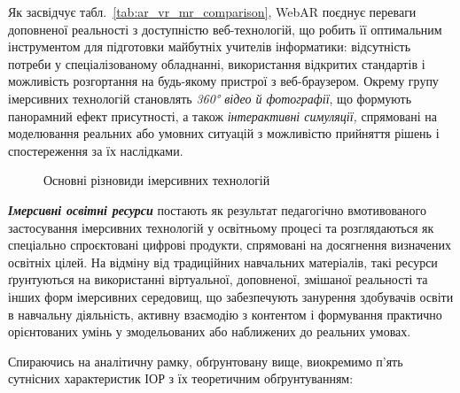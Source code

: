Як засвідчує табл.~\ref{tab:ar_vr_mr_comparison}, WebAR поєднує переваги доповненої реальності з доступністю веб-технологій, що робить її оптимальним інструментом для підготовки майбутніх учителів інформатики: відсутність потреби у спеціалізованому обладнанні, використання відкритих стандартів і можливість розгортання на будь-якому пристрої з веб-браузером. Окрему групу імерсивних технологій становлять \emph{360° відео й фотографії}, що формують панорамний ефект присутності, а також \emph{інтерактивні симуляції,} спрямовані на моделювання реальних або умовних ситуацій з можливістю прийняття рішень і спостереження за їх наслідками.

\begin{figure}[!h]
\centering

\caption{Основні різновиди імерсивних технологій}
\label{fig:1.3}
\end{figure}

\emph{\textbf{Імерсивні освітні ресурси}} постають як результат педагогічно вмотивованого застосування імерсивних технологій у освітньому процесі та розглядаються як спеціально спроєктовані цифрові продукти, спрямовані на досягнення визначених освітніх цілей. На відміну від традиційних навчальних матеріалів, такі ресурси ґрунтуються на використанні віртуальної, доповненої, змішаної реальності та інших форм імерсивних середовищ, що забезпечують занурення здобувачів освіти в навчальну діяльність, активну взаємодію з контентом і формування практично орієнтованих умінь у змодельованих або наближених до реальних умовах.

Спираючись на аналітичну рамку, обґрунтовану вище, виокремимо п'ять сутнісних характеристик ІОР з їх теоретичним обґрунтуванням:

